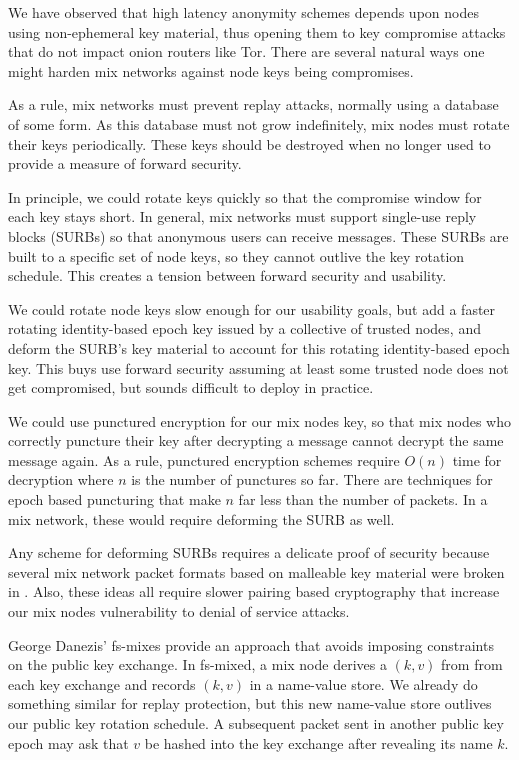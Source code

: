 \documentclass[twoside,letterpaper]{llncs}
\begin{document}
We have observed that high latency anonymity schemes depends upon
nodes using non-ephemeral key material, thus opening them to key
compromise attacks that do not impact onion routers like Tor.
There are several natural ways one might harden mix networks against
node keys being compromises. 

As a rule, mix networks must prevent replay attacks, normally using
a database of some form.  As this database must not grow indefinitely,
mix nodes must rotate their keys periodically.  These keys should be
destroyed when no longer used to provide a measure of forward security.

In principle, we could rotate keys quickly so that the compromise
window for each key stays short.  In general, mix networks must
support single-use reply blocks (SURBs) so that anonymous users can
receive messages.  These SURBs are built to a specific set of node
keys, so they cannot outlive the key rotation schedule.  This creates
a tension between forward security and usability.

We could rotate node keys slow enough for our usability goals, but add
a faster rotating identity-based epoch key issued by a collective of
trusted nodes, and deform the SURB's key material to account for this
rotating identity-based epoch key.  This buys use forward security
assuming at least some trusted node does not get compromised, but
sounds difficult to deploy in practice. 

We could use punctured encryption \cite{libforwardsec} for our
mix nodes key, so that mix nodes who correctly puncture their key
after decrypting a message cannot decrypt the same message again. 
As a rule, punctured encryption schemes require $O(n)$ time for
decryption where $n$ is the number of punctures so far.  There are
techniques for epoch based puncturing that make $n$ far less than
the number of packets.  In a mix network, these would require
deforming the SURB as well. 

Any scheme for deforming SURBs requires a delicate proof of security
because several mix network packet formats based on malleable key
material were broken in \cite{Danezis2006}. 
Also, these ideas all require slower pairing based cryptography that
increase our mix nodes vulnerability to denial of service attacks. 

George Danezis' fs-mixes \cite{fs-mix} provide an approach that
avoids imposing constraints on the public key exchange.  In fs-mixed,
a mix node derives a $(k,v)$ from from each key exchange and records
$(k,v)$  in a name-value store.  We already do something similar for 
replay protection, but this new name-value store outlives our public
key rotation schedule.  A subsequent packet sent in another public
key epoch may ask that $v$ be hashed into the key exchange after
revealing its name $k$.  
\end{document}
